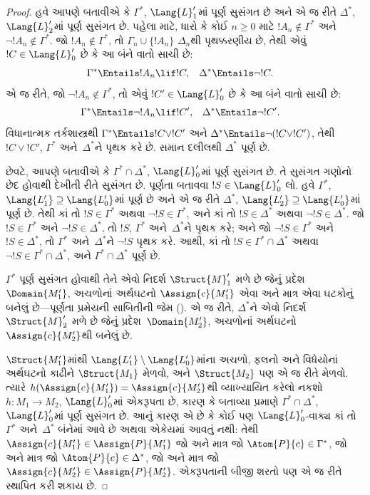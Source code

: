 \begin{proof}
હવે આપણે બતાવીએ કે $\Gamma^*$, $\Lang{L}'_1$માં પૂર્ણ સુસંગત છે અને
એ જ રીતે $\Delta^*$, $\Lang{L}'_2$માં પૂર્ણ સુસંગત છે. પહેલા માટે,
ધારો કે કોઈ $n\ge0$ માટે $!A_n\notin\Gamma^*$ અને $\lnot !A_n
\notin\Gamma^*$. જો $!A_n\notin\Gamma^*$, તો $\Gamma_n\cup\{!A_n\}$
$\Delta_n$થી પૃથક્કરણીય છે, તેથી એવું $!C\in\Lang{L}'_0$ છે કે આ
બંને વાતો સાચી છે:
\begin{align*}
  \Gamma^* & \Entails !A_n \lif !C, &
  \Delta^* & \Entails \lnot !C.
\end{align*}
એ જ રીતે, જો $\lnot !A_n\notin\Gamma^*$, તો એવું $!C'\in
\Lang{L}'_0$ છે કે આ બંને વાતો સાચી છે:
\begin{align*}
  \Gamma^* & \Entails \lnot !A_n \lif !C', &
  \Delta^* & \Entails \lnot !C'.
\end{align*}
વિધાનાત્મક તર્કશાસ્ત્રથી $\Gamma^*\Entails !C\lor !C'$ અને
$\Delta^*\Entails\lnot(!C\lor !C')$, તેથી $!C\lor !C'$,
$\Gamma^*$ અને~$\Delta^*$ને પૃથક કરે છે. સમાન દલીલથી $\Delta^*$ પૂર્ણ
છે.

છેવટે, આપણે બતાવીએ કે $\Gamma^*\cap\Delta^*$, $\Lang{L}'_0$માં પૂર્ણ
સુસંગત છે. તે સુસંગત ગણોનો છેદ હોવાથી દેખીતી રીતે સુસંગત છે. પૂર્ણતા
બતાવવા $!S\in\Lang{L}'_0$ લો. હવે $\Gamma^*$, $\Lang{L'_1}
\supseteq\Lang{L'_0}$માં પૂર્ણ છે અને એ જ રીતે $\Delta^*$,
$\Lang{L'_2}\supseteq\Lang{L'_0}$માં પૂર્ણ છે. તેથી કાં તો
$!S\in\Gamma^*$ અથવા $\lnot !S\in\Gamma^*$, અને કાં તો
$!S\in\Delta^*$ અથવા $\lnot !S\in\Delta^*$. જો $!S\in\Gamma^*$ અને
$\lnot !S\in\Delta^*$, તો $!S$, $\Gamma^*$ અને~$\Delta^*$ને પૃથક
કરે; અને જો $\lnot !S\in\Gamma^*$ અને $!S\in\Delta^*$, તો
$\Gamma^*$ અને~$\Delta^*$ને $\lnot !S$ પૃથક કરે. આથી, કાં તો
$!S\in\Gamma^*\cap\Delta^*$
અથવા $\lnot !S\in\Gamma^*\cap\Delta^*$, અને
$\Gamma^*\cap\Delta^*$ પૂર્ણ છે.

$\Gamma^*$ પૂર્ણ સુસંગત હોવાથી તેને એવો નિદર્શ $\Struct{M}'_1$ મળે
છે જેનું પ્રદેશ~$\Domain{M'_1}$, અચળોનાં અર્થઘટનો
$\Assign{c}{M'_1}$ એવા અને માત્ર એવા ઘટકોનું બનેલું છે---પૂર્ણતા
પ્રમેયની સાબિતીની જેમ (). એ જ
રીતે, $\Delta^*$ને એવો નિદર્શ~$\Struct{M}'_2$ મળે છે જેનું
પ્રદેશ~$\Domain{M'_2}$, અચળોનાં અર્થઘટનો
$\Assign{c}{M'_2}$થી બનેલું છે.

$\Struct{M'_1}$માંથી $\Lang{L'_1}\setminus\Lang{L'_0}$માંના
અચળો, ફલનો અને વિધેયોનાં અર્થઘટનો કાઢીને
$\Struct{M_1}$ મેળવો, અને $\Struct{M_2}$ પણ એ જ રીતે મેળવો. ત્યારે
$h(\Assign{c}{M'_1})=\Assign{c}{M'_2}$થી વ્યાખ્યાયિત કરેલો નકશો
$h\colon M_1\to M_2$, $\Lang{L}'_0$માં એકરૂપતા છે, કારણ કે બતાવ્યા
પ્રમાણે $\Gamma^*\cap\Delta^*$, $\Lang{L}'_0$માં પૂર્ણ સુસંગત છે.
આનું કારણ એ છે કે કોઈ પણ $\Lang{L}'_0$-વાક્ય કાં તો $\Gamma^*$
અને~$\Delta^*$ બંનેમાં આવે છે અથવા એકેયમાં આવતું નથી: તેથી
$\Assign{c}{M'_1}\in\Assign{P}{M'_1}$ જો અને માત્ર જો
$\Atom{P}{c}\in\Gamma^*$, જો અને માત્ર જો $\Atom{P}{c}\in\Delta^*$,
જો અને માત્ર જો $\Assign{c}{M'_2}\in\Assign{P}{M'_2}$. એકરૂપતાની
બીજી શરતો પણ એ જ રીતે સ્થાપિત કરી શકાય છે.


\end{proof}
